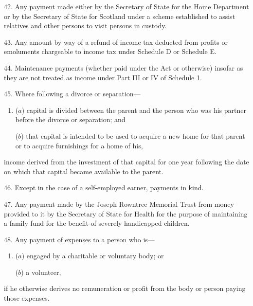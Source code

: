 \documentclass[12pt,a4paper]{article}
\begin{document}
\medskip

42.  Any payment made either by the Secretary of State for the Home Department or by the Secretary of State for Scotland under a scheme established to assist relatives and other persons to visit persons in custody.

\medskip

43.  Any amount by way of a refund of income tax deducted from profits or emoluments chargeable to income tax under Schedule D or Schedule E.

\medskip

44.  Maintenance payments (whether paid under the Act or otherwise) insofar as they are not treated as income under Part III or IV
of Schedule 1.  %


\medskip

45.  Where following a divorce or separation—
\begin{enumerate}\item[]
($a$) capital is divided between the parent and the person who was his partner before the divorce or separation; and

($b$) that capital is intended to be used to acquire a new home for that parent or to acquire furnishings for a home of his,
\end{enumerate}
income derived from the investment of that capital for one year following the date on which that capital became available to the parent.

\medskip

46.  Except in the case of a self-employed earner, payments in kind.


\medskip

47.  Any payment made by the Joseph Rowntree Memorial Trust from money provided to it by the Secretary of State for Health for the purpose of maintaining a family fund for the benefit of severely handicapped children.

\medskip

48.  Any payment of expenses to a person who is—
\begin{enumerate}\item[]
($a$) engaged by a charitable or voluntary body; or

($b$) a volunteer,
\end{enumerate}
if he otherwise derives no remuneration or profit from the body or person paying those expenses.
\end{document}
